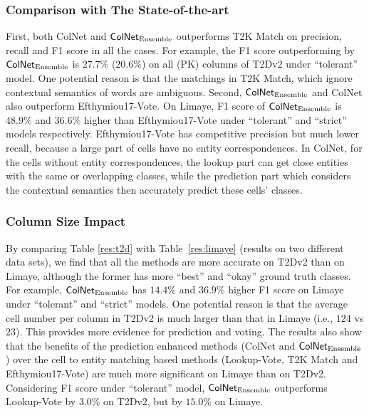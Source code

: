 \documentclass[letterpaper]{article}
\newcommand{\rv}[1]{{\color{black}#1}}
\newcommand{\camera}[1]{{\color{black}#1}}
\newcommand{\ColNet}{\textsf{ColNet}\xspace}
\begin{document}
\subsubsection{Comparison with \rv{The State-of-the-art}}
\rv{
First, both \ColNet and $\text{\ColNet}_{\text{Ensemble}}$ outperforms T2K Match on precision, recall and F1 score in all the cases.
For example, the F1 score outperforming by $\text{\ColNet}_{\text{Ensemble}}$ is $27.7\%$ ($20.6\%$) on all (PK) columns of T2Dv2 under ``tolerant'' model.
One potential reason is that the matchings in T2K Match, which ignore contextual semantics of words are ambiguous.
}
\rv{Second, $\text{\ColNet}_{\text{Ensemble}}$ and \ColNet also outperform Efthymiou17-Vote.}
On Limaye,
F1 score of $\text{\ColNet}_{\text{Ensemble}}$ is $48.9\%$ and $36.6\%$ higher than Efthymiou17-Vote under ``tolerant''  and ``strict'' models respectively.
Efthymiou17-Vote has competitive precision but much lower recall,
because a large part of cells have no entity correspondences.
\rv{In \ColNet, for the cells without entity correspondences, the lookup part can get close entities with the same or overlapping classes,
while the prediction part which considers the contextual semantics then accurately predict these cells' classes. }

\subsubsection{Column Size Impact}
By comparing Table \ref{res:t2d} with Table~\ref{res:limaye} \camera{(results on two different data sets)},
we \camera{find that} all the methods are more accurate on T2Dv2 than on Limaye,
although the former has more ``best'' and ``okay'' ground truth classes.
For example,
$\text{\ColNet}_{\text{Ensemble}}$ has \rv{$14.4\%$ and $36.9\%$} higher F1 score on Limaye under ``tolerant'' and ``strict'' models.
One potential reason is that the average cell number per column in T2Dv2 
is much larger than that in Limaye (i.e., $124$ vs $23$).
\camera{This} provides more evidence for prediction and voting. 
\rv{The results also show that the 
\camera{benefits}
of the prediction enhanced methods (\ColNet and $\text{\ColNet}_{\text{Ensemble}}$) over the cell to entity matching based methods (Lookup-Vote, T2K Match and Efthymiou17-Vote) \camera{are} much more significant on Limaye than on T2Dv2. 
Considering F1 score under ``tolerant'' model, 
$\text{\ColNet}_{\text{Ensemble}}$ outperforms Lookup-Vote by $3.0\%$  on T2Dv2, but by $15.0\%$ on Limaye.
}
\end{document}
